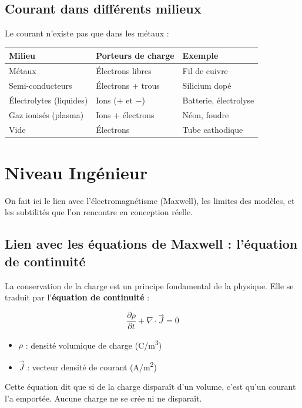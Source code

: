 \documentclass[12pt,a4paper,twoside]{book}
\begin{document}
\subsection{Courant dans différents milieux}

Le courant n'existe pas que dans les métaux :

\begin{center}
\begin{tabular}{lll}
\toprule
\textbf{Milieu} & \textbf{Porteurs de charge} & \textbf{Exemple} \\
\midrule
Métaux & Électrons libres & Fil de cuivre \\
Semi-conducteurs & Électrons + trous & Silicium dopé \\
Électrolytes (liquides) & Ions ($+$ et $-$) & Batterie, électrolyse \\
Gaz ionisés (plasma) & Ions + électrons & Néon, foudre \\
Vide & Électrons & Tube cathodique \\
\bottomrule
\end{tabular}
\end{center}

\section{Niveau Ingénieur}

\begin{ingenieur}
On fait ici le lien avec l'électromagnétisme (Maxwell), les limites des modèles, et les subtilités que l'on rencontre en conception réelle.
\end{ingenieur}

\subsection{Lien avec les équations de Maxwell : l'équation de continuité}

La conservation de la charge est un principe fondamental de la physique. Elle se traduit par l'\textbf{équation de continuité} :

\begin{formule}
\[
\boxed{\frac{\partial \rho}{\partial t} + \nabla \cdot \vec{J} = 0}
\]
\begin{itemize}[nosep]
\item $\rho$ : densité volumique de charge (\si{C/m^3})
\item $\vec{J}$ : vecteur densité de courant (\si{A/m^2})
\end{itemize}
Cette équation dit que si de la charge disparaît d'un volume, c'est qu'un courant l'a emportée. Aucune charge ne se crée ni ne disparaît.
\end{formule}
\end{document}
